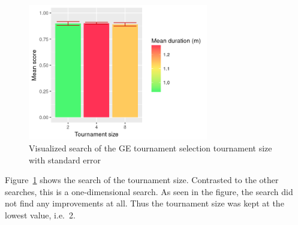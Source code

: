 \begin{figure}
    \centering
    \includegraphics[width=0.7\textwidth]{figures/ge-tournament-sampling}
    \caption[Visualized search of the GE tournament selection tournament size]{Visualized search of the GE tournament selection tournament size with standard error}
    \label{fig:tournament-sampling}
\end{figure}

Figure~\ref{fig:tournament-sampling} shows the search of the tournament size.
Contrasted to the other searches, this is a one-dimensional search.
As seen in the figure, the search did not find any improvements at all.
Thus the tournament size was kept at the lowest value, i.e.\ 2.


